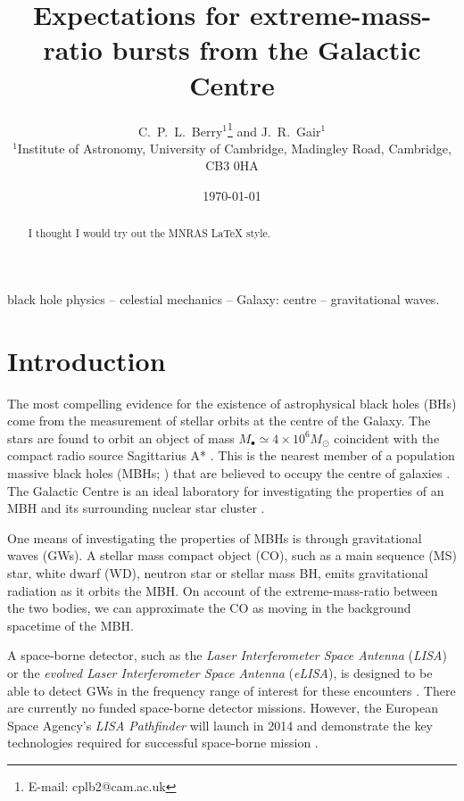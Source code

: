 \documentclass[useAMS,usedcolumn,usegraphicx,usenatbib]{mn2e}
\title[Expectations for EMRBs from the GC]{Expectations for extreme-mass-ratio bursts from the Galactic Centre}
\author[C.\ P.\ L.\ Berry and J.\ R.\ Gair]{C.\ P.\ L.\ Berry$^{1}$\thanks{E-mail:
cplb2@cam.ac.uk}  and J.\ R.\ Gair$^{1}$\\
$^{1}$Institute of Astronomy, University of Cambridge, Madingley Road, Cambridge, CB3 0HA}
\begin{document}
\date{\today}

\pagerange{\pageref{firstpage}--\pageref{lastpage}} 

\maketitle

\label{firstpage}

\begin{abstract}
I thought I would try out the MNRAS \LaTeX{} style.
\end{abstract}

\begin{keywords}
black hole physics -- celestial mechanics -- Galaxy: centre -- gravitational waves.
\end{keywords}

\section{Introduction}

The most compelling evidence for the existence of astrophysical black holes (BHs) come from the measurement of stellar orbits at the centre of the Galaxy. The stars are found to orbit an object of mass $M_\bullet \simeq 4 \times 10^6 M_\odot$ coincident with the compact radio source Sagittarius A* \citep{Reid2004, Ghez2008, Gillessen2009}. This is the nearest member of a population massive black holes (MBHs; \citealt{Volonteri2010}) that are believed to occupy the centre of galaxies \citep{Lynden-Bell1969, Lynden-Bell1971, Rees1984, Ferrarese2005}. The Galactic Centre is an ideal laboratory for investigating the properties of an MBH and its surrounding nuclear star cluster \citep{Genzel2010}.

One means of investigating the properties of MBHs is through gravitational waves (GWs). A stellar mass compact object (CO), such as a main sequence (MS) star, white dwarf (WD), neutron star or stellar mass BH, emits gravitational radiation as it orbits the MBH. On account of the extreme-mass-ratio between the two bodies, we can approximate the CO as moving in the background spacetime of the MBH.

A space-borne detector, such as the \textit{Laser Interferometer Space Antenna} (\textit{LISA}) or the \textit{evolved Laser Interferometer Space Antenna} (\textit{eLISA}), is designed to be able to detect GWs in the frequency range of interest for these encounters \citep{Bender1998, Danzmann2003, Jennrich2011, Amaro-Seoane2012a}. There are currently no funded space-borne detector missions. However, the European Space Agency's \textit{LISA Pathfinder} will launch in 2014 and demonstrate the key technologies required for successful space-borne mission \citep{Anza2005, Antonucci2012}.
\end{document}
